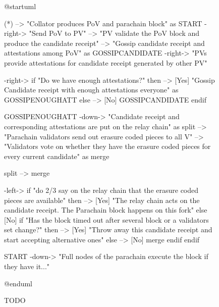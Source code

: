 \documentclass{book}
\begin{document}
\begin{figure}[h!]
\begin{plantuml}
@startuml

(*) --> "Collator produces PoV and parachain block" as START
-right-> "Send PoV to PV"
--> "PV validate the PoV block and produce the candidate receipt"
--> "Gossip candidate receipt and attestations among PoV" as GOSSIPCANDIDATE
-right-> "PVs provide attestations for candidate receipt generated by other PV"

-right-> if "Do we have enough attestations?" then
    --> [Yes] "Gossip Candidate receipt with enough attestations everyone" as GOSSIPENOUGHATT
else
    --> [No] GOSSIPCANDIDATE
endif

GOSSIPENOUGHATT -down-> "Candidate receipt and corresponding attestations are put on the relay chain" as split
--> "Parachain validators send out erasure coded pieces to all V"
--> "Validators vote on whether they have the erasure coded pieces for every current candidate" as merge

split --> merge

-left-> if "do 2/3 say on the relay chain that the erasure coded pieces are available" then
    --> [Yes] "The relay chain acts on the candidate receipt. The Parachain block happens on this fork"
else
    [No] if "Has the block timed out after several block or a validators set change?" then
        --> [Yes] "Throw away this candidate receipt and start accepting alternative ones"
    else
        --> [No] merge
    endif
endif


START -down-> "Full nodes of the parachain execute the block if they have it..."

@enduml
\end{plantuml}
\caption{TODO}
\end{figure}
\end{document}

